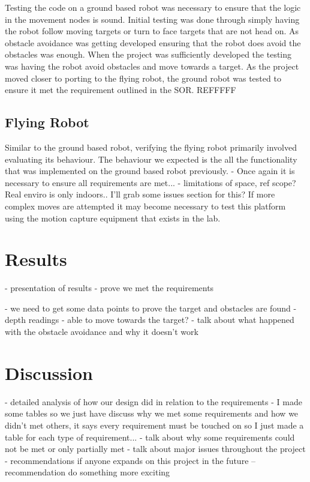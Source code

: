 \documentclass{article}
\begin{document}
	Testing the code on a ground based robot was necessary to ensure that the logic in the movement nodes is sound. Initial testing was done through simply having the robot follow moving targets or turn to face targets that are not head on. As obstacle avoidance was getting developed ensuring that the robot does avoid the obstacles was enough. When the project was sufficiently developed the testing was having the robot avoid obstacles and move towards a target. As the project moved closer to porting to the flying robot, the ground robot was tested to ensure it met the requirement outlined in the SOR. REFFFFF

		\subsection{Flying Robot}
	
	Similar to the ground based robot, verifying the flying robot primarily involved evaluating its behaviour. The behaviour we expected is the all the functionality that was implemented on the ground based robot previously. 
- Once again it is necessary to ensure all requirements are met... 
- limitations of space, ref scope? Real enviro is only indoors.. I'll grab some issues section for this?
If more complex moves are attempted it may become necessary to test this platform using the motion capture equipment that exists in the lab.

	
\section{Results}
	- presentation of results
	- prove we met the requirements

	- we need to get some data points to prove the target and obstacles are found
	- depth readings
	- able to move towards the target? 
	- talk about what happened with the obstacle avoidance and why it doesn't work


\renewcommand{\arraystretch}{2}
\section{Discussion}

	- detailed analysis of how our design did in relation to the requirements
	- I made some tables so we just have discuss why we met some requirements and how we didn't met others, it says every requirement must be touched on so I just made a table for each type of requirement...
	- talk about why some requirements could not be met or only partially met
	- talk about major issues throughout the project
	- recommendations if anyone expands on this project in the future -- recommendation do something more exciting
\end{document}
